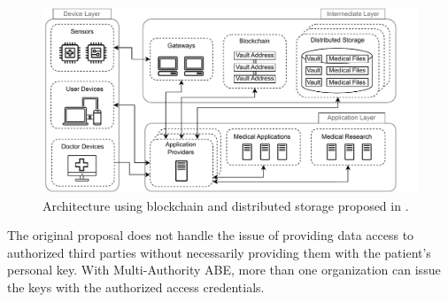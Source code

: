 \documentclass[cic,tc,english]{iiufrgs}
\numberwithin{algorithm}{chapter}
\begin{document}
            \begin{figure}[H]
                \centering
                \includegraphics[width=1\textwidth]{images/diagrams/fig2-grefo.drawio.pdf}
                \caption{Architecture using blockchain and distributed storage proposed in \cite{laura2023}.}
                \label{fig:laura_arch}
            \end{figure}

            The original proposal does not handle the issue of providing data access to authorized third parties without necessarily providing them with the patient's personal key. With Multi-Authority ABE,  more than one organization can issue the keys with the authorized access credentials. 
\end{document}
